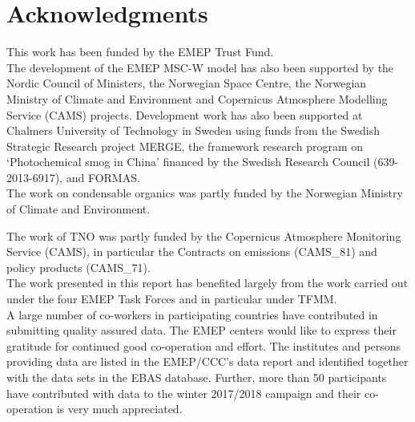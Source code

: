 \chapter*{Acknowledgments}

\enlargethispage{3\baselineskip}

\vspace{-2cm}


This work has been funded by the EMEP Trust Fund.\\

The development of the EMEP MSC-W model has also been supported by the Nordic Council of Ministers, the Norwegian Space Centre, the Norwegian Ministry of Climate and Environment and Copernicus Atmosphere Modelling Service (CAMS) projects.
Development work has also been supported at Chalmers University of Technology in Sweden using funds from the Swedish Strategic Research project MERGE, the 
framework research program on `Photochemical smog in China' financed by
the Swedish Research Council (639-2013-6917), and FORMAS.\\

The work on condensable organics was partly funded by the Norwegian Ministry of Climate and Environment. 


The work of TNO was partly funded
by the Copernicus Atmosphere Monitoring Service (CAMS),
in particular the Contracts on emissions (CAMS\_81) and policy products
(CAMS\_71).\\

The work presented in this report has benefited largely from the work carried out under the four EMEP Task Forces and in particular under TFMM.\\

A large number of co-workers in participating countries have contributed in submitting quality assured data. The EMEP centers would like to express their gratitude for continued good co-operation and effort. The institutes and persons providing data are listed in the EMEP/CCC's data report and identified together with the data sets in the EBAS database. Further, more than 50 participants have contributed with data to the winter 2017/2018 campaign and their co-operation is very much appreciated.\\

